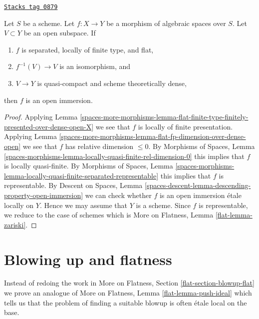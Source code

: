 \begin{lemma}[Zariski]
\label{spaces-more-morphisms-lemma-zariski}
\href{https://stacks.math.columbia.edu/tag/0879}{\texttt{Stacks tag 0879}}

Let $S$ be a scheme.
Let $f : X \to Y$ be a morphism of algebraic spaces over $S$.
Let $V \subset Y$ be an open subspace. If
\begin{enumerate}
\item $f$ is separated, locally of finite type, and flat,
\item $f^{-1}(V) \to V$ is an isomorphism, and
\item $V \to Y$ is quasi-compact and scheme theoretically dense,
\end{enumerate}
then $f$ is an open immersion.
\end{lemma}

\begin{proof}
Applying
Lemma \ref{spaces-more-morphisms-lemma-flat-finite-type-finitely-presented-over-dense-open-X}
we see that $f$ is locally of finite presentation. Applying
Lemma \ref{spaces-more-morphisms-lemma-flat-fp-dimension-over-dense-open}
we see that $f$ has relative dimension $\leq 0$.
By Morphisms of Spaces, Lemma
\ref{spaces-morphisms-lemma-locally-quasi-finite-rel-dimension-0}
this implies that $f$ is locally quasi-finite.
By Morphisms of Spaces, Lemma
\ref{spaces-morphisms-lemma-locally-quasi-finite-separated-representable}
this implies that $f$ is representable.
By Descent on Spaces, Lemma
\ref{spaces-descent-lemma-descending-property-open-immersion}
we can check whether $f$ is an open immersion \'etale locally on $Y$.
Hence we may assume that $Y$ is a scheme. Since $f$ is representable,
we reduce to the case of schemes which is
More on Flatness, Lemma \ref{flat-lemma-zariski}.
\end{proof}

\section{Blowing up and flatness}
\label{spaces-more-morphisms-section-blowup-flat}
Instead of redoing the work in
More on Flatness, Section \ref{flat-section-blowup-flat}
we prove an analogue of More on Flatness, Lemma \ref{flat-lemma-push-ideal}
which tells us that the problem of finding a suitable blowup
is often \'etale local on the base.

